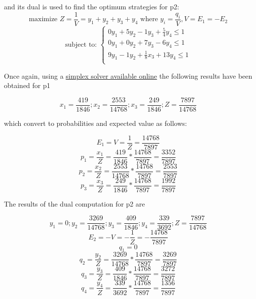\documentclass[12pt, a4paper]{article}
\begin{document}
and its dual is used to find the optimum strategies for p2:
\begin{equation}
    \text{maximize }Z=\frac{1}{V}=y_1+y_2+y_3+y_4 \text{ where } y_i=\frac{q_i}{V}, V=E_1=-E_2
\end{equation}
\begin{equation}
    \text{subject to: }
    \begin{cases}
        0y_1+5y_2-1y_3+\frac{5}{4}y_4 \leq 1 \\
        0y_1+0y_2+7y_3-6y_4 \leq 1 \\
        9y_1-1y_2+\frac{1}{8}x_3+13y_4 \leq 1 \\
    \end{cases}
\end{equation}

Once again, using a \href{https://matrixcalc.org/en/slu.html}{simplex solver available online} the following results have been obtained for p1

\begin{equation}
    x_1=\frac{419}{1846};x_2=\frac{2553}{14768};x_3=\frac{249}{1846};Z=\frac{7897}{14768}
\end{equation}

which convert to probabilities and expected value as follows:

\begin{equation}
    E_1=V=\frac{1}{Z}=\frac{14768}{7897}
\end{equation}
\begin{equation}
    p_1=\frac{x_1}{Z}=\frac{419}{1846}*\frac{14768}{7897}=\frac{3352}{7897}
\end{equation}
\begin{equation}
    p_2=\frac{x_2}{Z}=\frac{2553}{14768}*\frac{14768}{7897}=\frac{2553}{7897}
\end{equation}
\begin{equation}
    p_3=\frac{x_3}{Z}=\frac{249}{1846}*\frac{14768}{7897}=\frac{1992}{7897}
\end{equation}

The results of the dual computation for p2 are 

\begin{equation}
    y_1=0;y_2=\frac{3269}{14768};y_3=\frac{409}{1846};y_4=\frac{339}{3692};Z=\frac{7897}{14768}
\end{equation}
\begin{equation}
    E_2=-V=-\frac{1}{Z}=-\frac{14768}{7897}
\end{equation}
\begin{equation}
    q_1=0
\end{equation}
\begin{equation}
    q_2=\frac{y_2}{Z}=\frac{3269}{14768}*\frac{14768}{7897}=\frac{3269}{7897}
\end{equation}
\begin{equation}
    q_3=\frac{y_3}{Z}=\frac{409}{1846}*\frac{14768}{7897}=\frac{3272}{7897}
\end{equation}
\begin{equation}
    q_4=\frac{y_4}{Z}=\frac{339}{3692}*\frac{14768}{7897}=\frac{1356}{7897}
\end{equation}
\end{document}
